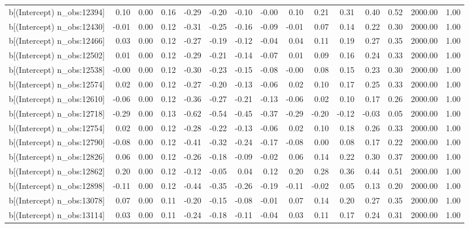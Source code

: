 \begin{table}[ht]
\begin{tabular}{rrrrrrrrrrrrrrr}
  b[(Intercept) n\_obs:12394] & 0.10 & 0.00 & 0.16 & -0.29 & -0.20 & -0.10 & -0.00 & 0.10 & 0.21 & 0.31 & 0.40 & 0.52 & 2000.00 & 1.00 \\ 
  b[(Intercept) n\_obs:12430] & -0.01 & 0.00 & 0.12 & -0.31 & -0.25 & -0.16 & -0.09 & -0.01 & 0.07 & 0.14 & 0.22 & 0.30 & 2000.00 & 1.00 \\ 
  b[(Intercept) n\_obs:12466] & 0.03 & 0.00 & 0.12 & -0.27 & -0.19 & -0.12 & -0.04 & 0.04 & 0.11 & 0.19 & 0.27 & 0.35 & 2000.00 & 1.00 \\ 
  b[(Intercept) n\_obs:12502] & 0.01 & 0.00 & 0.12 & -0.29 & -0.21 & -0.14 & -0.07 & 0.01 & 0.09 & 0.16 & 0.24 & 0.33 & 2000.00 & 1.00 \\ 
  b[(Intercept) n\_obs:12538] & -0.00 & 0.00 & 0.12 & -0.30 & -0.23 & -0.15 & -0.08 & -0.00 & 0.08 & 0.15 & 0.23 & 0.30 & 2000.00 & 1.00 \\ 
  b[(Intercept) n\_obs:12574] & 0.02 & 0.00 & 0.12 & -0.27 & -0.20 & -0.13 & -0.06 & 0.02 & 0.10 & 0.17 & 0.25 & 0.33 & 2000.00 & 1.00 \\ 
  b[(Intercept) n\_obs:12610] & -0.06 & 0.00 & 0.12 & -0.36 & -0.27 & -0.21 & -0.13 & -0.06 & 0.02 & 0.10 & 0.17 & 0.26 & 2000.00 & 1.00 \\ 
  b[(Intercept) n\_obs:12718] & -0.29 & 0.00 & 0.13 & -0.62 & -0.54 & -0.45 & -0.37 & -0.29 & -0.20 & -0.12 & -0.03 & 0.05 & 2000.00 & 1.00 \\ 
  b[(Intercept) n\_obs:12754] & 0.02 & 0.00 & 0.12 & -0.28 & -0.22 & -0.13 & -0.06 & 0.02 & 0.10 & 0.18 & 0.26 & 0.33 & 2000.00 & 1.00 \\ 
  b[(Intercept) n\_obs:12790] & -0.08 & 0.00 & 0.12 & -0.41 & -0.32 & -0.24 & -0.17 & -0.08 & 0.00 & 0.08 & 0.17 & 0.22 & 2000.00 & 1.00 \\ 
  b[(Intercept) n\_obs:12826] & 0.06 & 0.00 & 0.12 & -0.26 & -0.18 & -0.09 & -0.02 & 0.06 & 0.14 & 0.22 & 0.30 & 0.37 & 2000.00 & 1.00 \\ 
  b[(Intercept) n\_obs:12862] & 0.20 & 0.00 & 0.12 & -0.12 & -0.05 & 0.04 & 0.12 & 0.20 & 0.28 & 0.36 & 0.44 & 0.51 & 2000.00 & 1.00 \\ 
  b[(Intercept) n\_obs:12898] & -0.11 & 0.00 & 0.12 & -0.44 & -0.35 & -0.26 & -0.19 & -0.11 & -0.02 & 0.05 & 0.13 & 0.20 & 2000.00 & 1.00 \\ 
  b[(Intercept) n\_obs:13078] & 0.07 & 0.00 & 0.11 & -0.20 & -0.15 & -0.08 & -0.01 & 0.07 & 0.14 & 0.20 & 0.27 & 0.35 & 2000.00 & 1.00 \\ 
  b[(Intercept) n\_obs:13114] & 0.03 & 0.00 & 0.11 & -0.24 & -0.18 & -0.11 & -0.04 & 0.03 & 0.11 & 0.17 & 0.24 & 0.31 & 2000.00 & 1.00 \\ 

\end{tabular}
\end{table}

